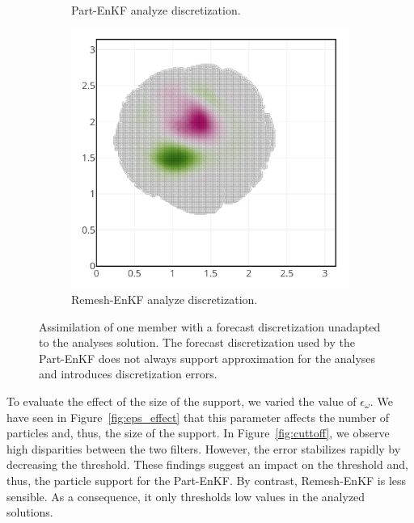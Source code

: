 \begin{figure}[h!]
\begin{subfigure}{0.32\textwidth}
		\caption{Part-EnKF analyze discretization.}
	\end{subfigure}
	\hfill
	\begin{subfigure}{0.32\textwidth}
		\centering
		\includegraphics[width=\linewidth]{./images/app2d/assim_member_rmf.png}
		\caption{Remesh-EnKF analyze discretization.}
	\end{subfigure}
	\caption{Assimilation of one member with a forecast discretization unadapted to the analyses solution. The forecast discretization used by the Part-EnKF does not always support approximation for the analyses and introduces discretization errors.}
	\label{fig:assim_member}
\end{figure}

To evaluate the effect of the size of the support, we varied the value of $\epsilon_{\omega}$. We have seen in Figure~\ref{fig:eps_effect} that this parameter affects the number of particles and, thus, the size of the support. In Figure~\ref{fig:cuttoff}, we observe high disparities between the two filters. However, the error stabilizes rapidly by decreasing the threshold. These findings suggest an impact on the threshold and, thus, the particle support for the Part-EnKF. By contrast, Remesh-EnKF is less sensible. As a consequence, it only thresholds low values in the analyzed solutions.

